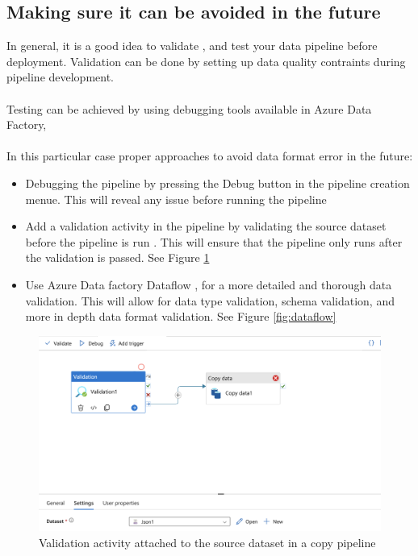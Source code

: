 \documentclass[11pt, oneside]{article}   	%
\begin{document}
\subsection{Making sure it can be avoided in the future}
In general, it is a good idea to validate \cite{validation}, and test your data pipeline before deployment. Validation can be done by setting up data quality contraints during pipeline development.\\
\\
Testing can be achieved by using debugging tools available in Azure Data Factory, \cite{debugtool}\\
\\
In this particular case proper approaches to avoid data format error in the future:
\begin{itemize}
\item Debugging the pipeline by pressing the Debug button in the pipeline creation menue. This will reveal any issue before running the pipeline
   \item Add a validation activity in the pipeline by validating the source dataset before the pipeline is run \cite{validation}. This will ensure that the pipeline only runs after the validation is passed. See Figure \ref{fig:validation}
   \item Use Azure Data factory Dataflow \cite{dataflow}, for a more detailed and thorough data validation. This will allow for data type validation, schema validation, and more in depth data format validation. See Figure \ref{fig:dataflow}
\end{itemize}

\begin{figure}[H] %
   \centering
   \includegraphics[width=6in]{images/validation} 
   \caption{Validation activity attached to the source dataset in a copy pipeline}
   \label{fig:validation}
\end{figure}
\end{document}
